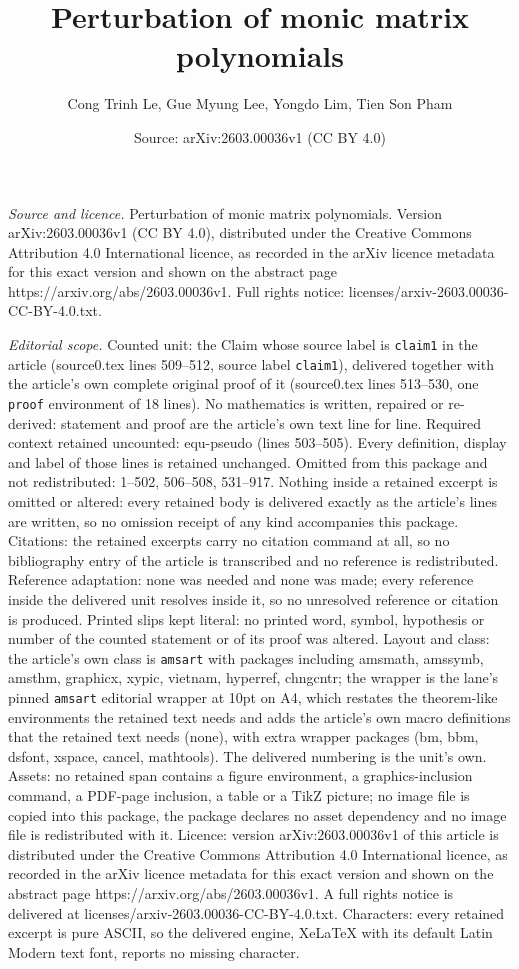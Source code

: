 \documentclass[10pt,a4paper]{amsart}
\title[Perturbation of monic matrix polynomials]{Perturbation of monic matrix polynomials}
\author{Cong Trinh Le, Gue Myung Lee, Yongdo Lim, Tien Son Pham}
\date{Source: arXiv:2603.00036v1 (CC BY 4.0)}
\begin{document}
\maketitle

\noindent\emph{Source and licence.} Perturbation of monic matrix polynomials. Version arXiv:2603.00036v1 (CC BY 4.0), distributed under the Creative Commons Attribution 4.0 International licence, as recorded in the arXiv licence metadata for this exact version and shown on the abstract page https://arxiv.org/abs/2603.00036v1. Full rights notice: licenses/arxiv-2603.00036-CC-BY-4.0.txt.\par\smallskip

\noindent\textit{Editorial scope.} Counted unit: the Claim whose source label is \texttt{claim1} in the article (source0.tex lines 509--512, source label \texttt{claim1}), delivered together with the article's own complete original proof of it (source0.tex lines 513--530, one \texttt{proof} environment of 18 lines). No mathematics is written, repaired or re-derived: statement and proof are the article's own text line for line. Required context retained uncounted: equ-pseudo (lines 503--505). Every definition, display and label of those lines is retained unchanged. Omitted from this package and not redistributed: 1--502, 506--508, 531--917. Nothing inside a retained excerpt is omitted or altered: every retained body is delivered exactly as the article's lines are written, so no omission receipt of any kind accompanies this package. Citations: the retained excerpts carry no citation command at all, so no bibliography entry of the article is transcribed and no reference is redistributed. Reference adaptation: none was needed and none was made; every reference inside the delivered unit resolves inside it, so no unresolved reference or citation is produced. Printed slips kept literal: no printed word, symbol, hypothesis or number of the counted statement or of its proof was altered. Layout and class: the article's own class is \texttt{amsart} with packages including amsmath, amssymb, amsthm, graphicx, xypic, vietnam, hyperref, chngcntr; the wrapper is the lane's pinned \texttt{amsart} editorial wrapper at 10pt on A4, which restates the theorem-like environments the retained text needs and adds the article's own macro definitions that the retained text needs (none), with extra wrapper packages (bm, bbm, dsfont, xspace, cancel, mathtools). The delivered numbering is the unit's own. Assets: no retained span contains a figure environment, a graphics-inclusion command, a PDF-page inclusion, a table or a TikZ picture; no image file is copied into this package, the package declares no asset dependency and no image file is redistributed with it. Licence: version arXiv:2603.00036v1 of this article is distributed under the Creative Commons Attribution 4.0 International licence, as recorded in the arXiv licence metadata for this exact version and shown on the abstract page https://arxiv.org/abs/2603.00036v1. A full rights notice is delivered at licenses/arxiv-2603.00036-CC-BY-4.0.txt. Characters: every retained excerpt is pure ASCII, so the delivered engine, XeLaTeX with its default Latin Modern text font, reports no missing character.
\end{document}
